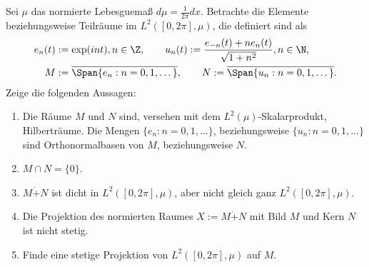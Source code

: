 \begin{exercise}
Sei $\mu$ das normierte Lebesguemaß $d\mu = \frac{1}{2\pi}dx$. Betrachte die Elemente
beziehungsweise Teilräume im $L^2([0,2\pi], \mu)$, die definiert sind als
\begin{align*}
  e_n(t) &:= \exp(int), n \in \Z, \qquad u_n(t) := \frac{e_{-n}(t) + ne_n(t)}{\sqrt{1+n^2}}, n \in \N, \\
  M &:= \overline{\Span \{e_n: n = 0,1,\dots\}}, \qquad N := \overline{\Span\{u_n: n = 0,1,\dots\}}.
\end{align*}
Zeige die folgenden Aussagen:
\begin{enumerate}[label = (\alph*)]
  \item Die Räume $M$ und $N$ sind, versehen mit dem $L^2(\mu)$-Skalarprodukt, Hilberträume.
  Die Mengen $\{e_n: n = 0,1,\dots\}$, beziehungsweise
  $\{u_n: n = 0,1,\dots\}$ sind Orthonormalbasen von $M$, beziehungsweise $N$.
  \item $M \cap N = \{0\}$.
  \item $M \dot+ N$ ist dicht in $L^2([0,2\pi],\mu)$, aber nicht gleich ganz $L^2([0,2\pi],\mu)$.
  \item Die Projektion des normierten Raumes $X := M \dot + N$ mit Bild $M$ und Kern $N$
  ist nicht stetig.
  \item Finde eine stetige Projektion von $L^2([0,2\pi],\mu)$ auf $M$.
\end{enumerate}
\end{exercise}

